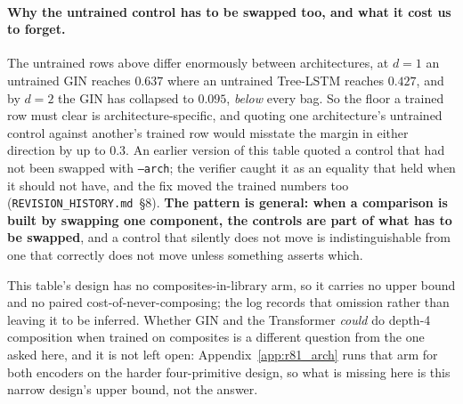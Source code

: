 \paragraph{Why the untrained control has to be swapped too, and what it cost us to forget.} The untrained rows above differ enormously between architectures, at $d{=}1$ an untrained GIN reaches $0.637$ where an untrained Tree-LSTM reaches $0.427$, and by $d{=}2$ the GIN has collapsed to $0.095$, \emph{below} every bag. So the floor a trained row must clear is architecture-specific, and quoting one architecture's untrained control against another's trained row would misstate the margin in either direction by up to $0.3$. An earlier version of this table quoted a control that had not been swapped with \texttt{--arch}; the verifier caught it as an equality that held when it should not have, and the fix moved the trained numbers too (\texttt{REVISION\_HISTORY.md}~\S8). \textbf{The pattern is general: when a comparison is built by swapping one component, the controls are part of what has to be swapped}, and a control that silently does not move is indistinguishable from one that correctly does not move unless something asserts which.

This table's design has no composites-in-library arm, so it carries no upper bound and no paired cost-of-never-composing; the log records that omission rather than leaving it to be inferred. Whether GIN and the Transformer \emph{could} do depth-4 composition when trained on composites is a different question from the one asked here, and it is not left open: Appendix~\ref{app:r81_arch} runs that arm for both encoders on the harder four-primitive design, so what is missing here is this narrow design's upper bound, not the answer.

